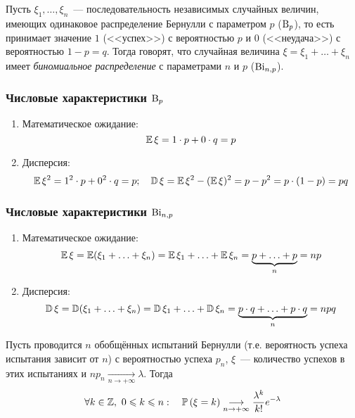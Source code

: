     \begin{defn}
        Пусть $\xi_1, \ldots, \xi_n$~--- последовательность независимых случайных величин, имеющих одинаковое распределение Бернулли с параметром $p$ ($\operatorname{\mathrm{B}}_{p}$), то есть принимает значение $1$ (<<успех>>) с вероятностью $p$ и $0$ (<<неудача>>) с вероятностью $1 - p = q$. Тогда говорят, что случайная величина $\xi = \xi_1 + \ldots + \xi_n$ имеет \textit{биномиальное распределение} с параметрами $n$ и $p$ ($\operatorname{\mathrm{Bi}}_{n, p}$).
    \end{defn}
    
    \subsubsection{Числовые характеристики $\operatorname{\mathrm{B}}_{p}$}
    \begin{enumerate}
        \item Математическое ожидание:
        \begin{equation*}
            \operatorname{\mathbb{E}} \xi =  1 \cdot p + 0 \cdot q = p
        \end{equation*}
        \item Дисперсия:
            $$\operatorname{\mathbb{E}} \xi^2 = 1^2 \cdot p + 0^2 \cdot q = p; \quad \operatorname{\mathbb{D}}\xi = \operatorname{\mathbb{E}} \xi^2 - (\operatorname{\mathbb{E}} \xi)^2 = p - p^2 = p \cdot (1 - p) = pq$$
    \end{enumerate}
    
    \subsubsection{Числовые характеристики $\operatorname{\mathrm{Bi}}_{n, p}$}
    \begin{enumerate}
        \item Математическое ожидание:
        \begin{equation*}
            \operatorname{\mathbb{E}} \xi = \operatorname{\mathbb{E}} (\xi_1 + \ldots + \xi_n) = \operatorname{\mathbb{E}} \xi_1 + \ldots + \operatorname{\mathbb{E}} \xi_n = \underbrace{p + \ldots + p}_{n} = np
        \end{equation*}
        \item Дисперсия:
        \begin{equation*}
            \operatorname{\mathbb{D}}\xi = \operatorname{\mathbb{D}}(\xi_1 + \ldots + \xi_n) = \operatorname{\mathbb{D}}\xi_1 + \ldots + \operatorname{\mathbb{D}}\xi_n = \underbrace{p \cdot q + \ldots + p \cdot q}_{n} = npq
        \end{equation*}
    \end{enumerate}
    
    \begin{namedthm}
        Пусть проводится $n$ обобщённых испытаний Бернулли (т.е. вероятность успеха испытания зависит от $n$) с вероятностью успеха $p_n$, $\xi$~--- количество успехов в этих испытаниях и $n p_{n} \underset{n \to +\infty}{\longrightarrow} \lambda$. Тогда
        \begin{equation*}
            \forall k \in \mathbb{Z},~ 0 \leqslant k \leqslant n: \quad \operatorname{\mathbb{P}}\left(\xi=k\right) \underset{n \to +\infty}{\longrightarrow} \frac{\lambda^{k}}{k !} e^{-\lambda}
        \end{equation*}
    \end{namedthm}
    
